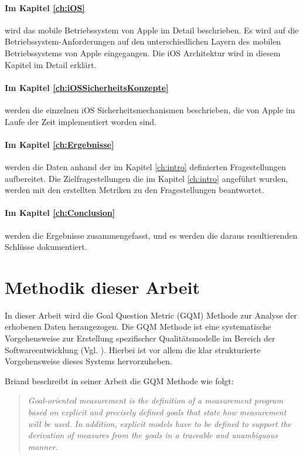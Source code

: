 \paragraph{Im Kapitel \ref{ch:iOS}} wird das mobile Betriebssystem von Apple im Detail beschrieben. Es wird auf die Betriebssystem-Anforderungen auf den unterschiedlichen Layern des mobilen Betriebssystems von Apple eingegangen. Die iOS Architektur wird in diesem Kapitel im Detail erklärt. 

\paragraph{Im Kapitel \ref{ch:iOSSicherheitsKonzepte}} werden die einzelnen iOS Sicherheitsmechanismen beschrieben, die von Apple im Laufe der Zeit implementiert worden sind.

\paragraph{Im Kapitel \ref{ch:Ergebnisse}} werden die Daten anhand der im Kapitel \ref{ch:intro} definierten Fragestellungen aufbereitet. Die Zielfragestellungen die im Kapitel \ref{ch:intro} angeführt wurden, werden mit den erstellten Metriken zu den Fragestellungen beantwortet.

\paragraph{Im Kapitel \ref{ch:Conclusion}} werden die Ergebnisse zusammengefasst, und es werden die daraus resultierenden Schlüsse dokumentiert.

\section{Methodik dieser Arbeit}
\label{sec:MethArbeit}
In dieser Arbeit wird die Goal Question Metric (GQM) Methode zur Analyse der erhobenen Daten herangezogen. Die GQM Methode ist eine systematische Vorgehensweise zur Erstellung spezifischer Qualitätsmodelle im Bereich der Softwareentwicklung (Vgl. \cite{GQM[1], GQM[2]}).  Hierbei ist vor allem die klar strukturierte Vorgehensweise dieses Systems hervorzuheben.\par

Briand beschreibt in seiner Arbeit die GQM Methode wie folgt: 
\begin{quote}
\textit{\glqq Goal-oriented measurement is the definition of a measurement program based on explicit and precisely defined goals that state how measurement will be used. In addition, explicit models have to be defined to support the derivation of measures from the goals in a traceable and unambiguous manner.\grqq{}} \cite{GQM[5]} 
\end{quote}

